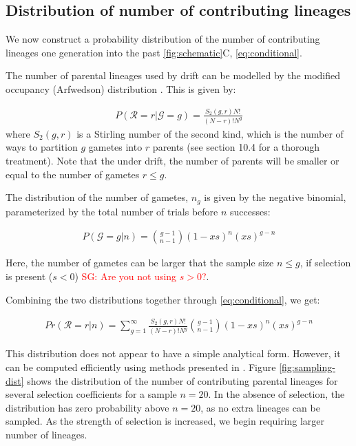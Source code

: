\documentclass[review]{elsarticle}
\newcommand{\sgcomment}[1]{\textcolor{red}{SG: #1}}
\begin{document}
\subsection{Distribution of number of contributing lineages}
\label{subsec:distribution}

We now construct a probability distribution of the number of contributing lineages one generation
into the past \ref{fig:schematic}C, \eqref{eq:conditional}. 

The number of parental lineages used by drift can be modelled by the modified occupancy
(Arfwedson) distribution \citep{Wakeley2009,ONeill2019,JohnsonEtAl2005}. This is given by:

\begin{align}
  \label{eq:occupancy}
  P(\mathcal{R}=r|\mathcal{G}=g) = \frac{S_2(g,r) N!}{(N-r)! N^g}
\end{align}
where $S_2(g,r)$ is a Stirling number of the second kind, which is the number of ways to partition
$g$ gametes into $r$ parents (see \cite{JohnsonEtAl2005} section 10.4 for a thorough treatment).
Note that the under drift, the number of parents will be smaller or equal to the number of gametes
$r \le g$.

The distribution of the number of gametes, $n_g$ is given by the negative binomial, parameterized by
the total number of trials before $n$ successes:

\begin{align}
  \label{eq:neg-binomial-trials}
  P(\mathcal{G}=g|n) = \binom{g-1}{n-1}(1-xs)^n(xs)^{g-n}
\end{align}

Here, the number of gametes can be larger that the sample size $n \le g$, if selection is present
($s<0$) \sgcomment{Are you not using $s>0$?}.


Combining the two distributions together through \ref{eq:conditional}, we get:

\begin{align}
  \label{eq:lineages-in-past}
   Pr(\mathcal{R}=r|n) = \sum_{g=1}^{\infty} \frac{S_2(g,r) N!}{(N-r)! N^g} \binom{g-1}{n-1}(1-xs)^n(xs)^{g-n}
\end{align}

This distribution does not appear to have a simple analytical form. However, it can be computed
efficiently using methods presented in \citep{ONeill2019}. Figure \ref{fig:sampling-dist} shows the
distribution of the number of contributing parental lineages for several selection coefficients for
a sample $n=20$. In the absence of selection, the distribution has zero probability above $n=20$, as
no extra lineages can be sampled. As the strength of selection is increased, we begin requiring
larger number of lineages.
\end{document}

